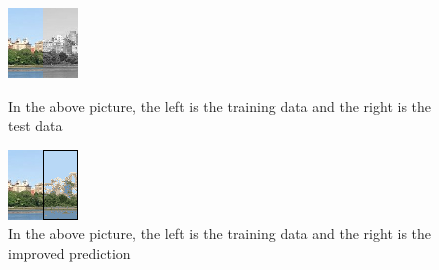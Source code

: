 \documentclass[12pt]{report}
\begin{document}
\begin{figure}[t]
\includegraphics[width=.5\textwidth]{Test Image}
\caption{In the above picture, the left is the training data and the right is the test data}
\includegraphics[width=.5\textwidth]{Improved Agent Prediction}
\caption{In the above picture, the left is the training data and the right is the improved prediction}
\end{figure}
\vfill
\clearpage
\end{document}

